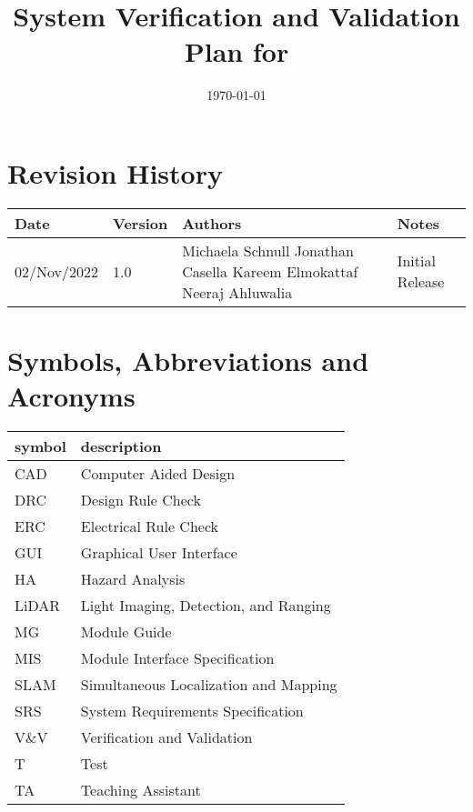 \documentclass[12pt, titlepage]{article}
\begin{document}
\title{System Verification and Validation Plan for \progname{}} 
\author{\authname}
\date{\today}
	
\maketitle


\section{Revision History}

\begin{tabularx}{\textwidth}{p{3cm}p{2cm}p{4cm}X}
\toprule {\bf Date} & {\bf Version} & {\bf Authors} & {\bf Notes}\\
\midrule
02/Nov/2022 & 1.0 & Michaela Schnull \newline Jonathan Casella \newline Kareem Elmokattaf \newline Neeraj Ahluwalia & Initial Release\\
\bottomrule
\end{tabularx}

\newpage

\tableofcontents

\listoftables
{}

\listoffigures
{}

\newpage

\section{Symbols, Abbreviations and Acronyms}

\renewcommand{\arraystretch}{1.2}
\begin{tabular}{l l} 
  \toprule		
  \textbf{symbol} & \textbf{description}\\
  \midrule 
  CAD & Computer Aided Design\\
  DRC & Design Rule Check\\
  ERC & Electrical Rule Check\\
  GUI & Graphical User Interface\\
  HA & Hazard Analysis\\
  LiDAR & Light Imaging, Detection, and Ranging\\
  MG & Module Guide\\
  MIS & Module Interface Specification\\
  SLAM & Simultaneous Localization and Mapping\\
  SRS & System Requirements Specification\\
  V\&V & Verification and Validation\\
  T & Test\\
  TA & Teaching Assistant\\
  \bottomrule
\end{tabular}\\
\end{document}
